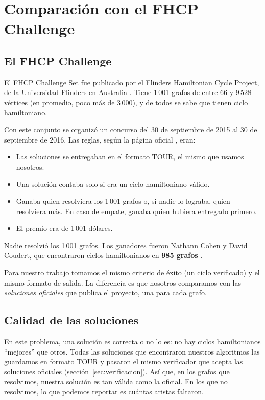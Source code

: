 \chapter{Comparación con el FHCP Challenge}
\label{cap:bench}

\section{El FHCP Challenge}
El FHCP Challenge Set fue publicado por el Flinders Hamiltonian Cycle Project, de la Universidad
Flinders en Australia \cite{aco8,aco9}. Tiene 1\,001 grafos de entre 66 y 9\,528 vértices (en
promedio, poco más de 3\,000), y de todos se sabe que tienen ciclo hamiltoniano.

Con este conjunto se organizó un concurso del 30 de septiembre de 2015 al 30 de septiembre de
2016. Las reglas, según la página oficial \cite{aco9}, eran:
\begin{itemize}
  \item Las soluciones se entregaban en el formato TOUR, el mismo que usamos nosotros.
  \item Una solución contaba solo si era un ciclo hamiltoniano válido.
  \item Ganaba quien resolviera los 1\,001 grafos o, si nadie lo lograba, quien resolviera más.
        En caso de empate, ganaba quien hubiera entregado primero.
  \item El premio era de 1\,001 dólares.
\end{itemize}

Nadie resolvió los 1\,001 grafos. Los ganadores fueron Nathann Cohen y David Coudert, que
encontraron ciclos hamiltonianos en \textbf{985 grafos} \cite{aco9}.

Para nuestro trabajo tomamos el mismo criterio de éxito (un ciclo verificado) y el mismo formato
de salida. La diferencia es que nosotros comparamos con las \emph{soluciones oficiales} que publica
el proyecto, una para cada grafo.

\section{Calidad de las soluciones}
En este problema, una solución es correcta o no lo es: no hay ciclos hamiltonianos ``mejores''
que otros. Todas las soluciones que encontraron nuestros algoritmos las guardamos en formato TOUR
y pasaron el mismo verificador que acepta las soluciones oficiales
(sección~\ref{sec:verificacion}). Así que, en los grafos que resolvimos, nuestra solución es tan
válida como la oficial. En los que no resolvimos, lo que podemos reportar es cuántas aristas
faltaron.

